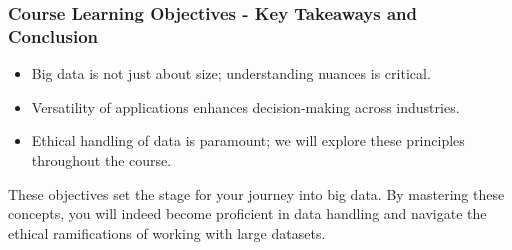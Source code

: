 \documentclass[aspectratio=169]{beamer}
\begin{document}
\begin{frame}[fragile]
    \frametitle{Course Learning Objectives - Key Takeaways and Conclusion}
    \begin{itemize}
        \item Big data is not just about size; understanding nuances is critical.
        \item Versatility of applications enhances decision-making across industries.
        \item Ethical handling of data is paramount; we will explore these principles throughout the course.
    \end{itemize}
    
    These objectives set the stage for your journey into big data. By mastering these concepts, you will indeed become proficient in data handling and navigate the ethical ramifications of working with large datasets.
\end{frame}
\end{document}
